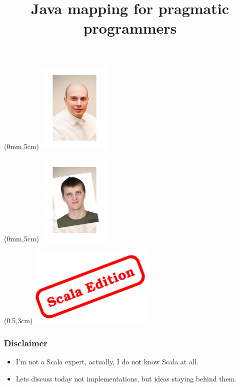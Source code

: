 \documentclass[14pt]{beamer}
\begin{document}
\title{Java mapping for pragmatic programmers}

\newcommand{\smaller}[1] {
  {\scriptsize {#1}}
}

\begin{frame}[t]
    \titlepage
    \begin{textblock*}{20mm}(0mm,5cm)%
      \includegraphics[width=35mm]{start1.png}
    \end{textblock*}
\end{frame}

\begin{frame}[t]
    \titlepage
    \begin{textblock*}{20mm}(0mm,5cm)%
      \includegraphics[width=35mm]{start2.png}
    \end{textblock*}
    \begin{textblock*}{20mm}(0.5\textwidth,3cm)%
      \includegraphics[width=6cm]{stamp.png}
    \end{textblock*}
\end{frame}


\frame
{\frametitle{Disclaimer}
\begin{itemize}
  \item<2-> I'm not a Scala expert, actually, I do not know Scala at all.
  \item<3-> Lets discuss today not implementations, but ideas staying behind them.
\end{itemize}
}
\end{document}
